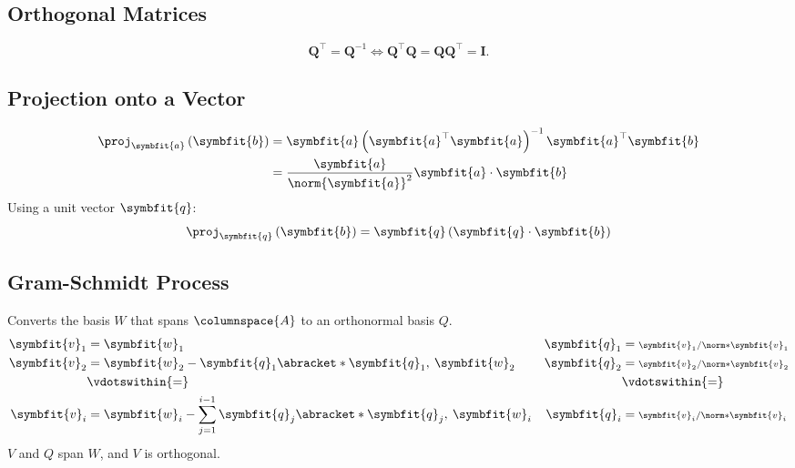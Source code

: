 \documentclass{article}
\begin{document}
\begin{multicols*}{3}
    \subsection{Orthogonal Matrices}
    \begin{equation*}
        \symbf{Q}^\top = \symbf{Q}^{-1}
        \iff
        \symbf{Q}^\top \symbf{Q} = \symbf{Q}\symbf{Q}^\top = \symbf{I}.
    \end{equation*}
    \subsection{Projection onto a Vector}
    \begin{align*}
        \proj_{\symbfit{a}} \left( \symbfit{b} \right) & = \symbfit{a} \left( \symbfit{a}^\top \symbfit{a} \right)^{-1} \symbfit{a}^\top \symbfit{b} \\
                                                       & = \frac{\symbfit{a}}{\norm{\symbfit{a}}^2} \symbfit{a} \cdot \symbfit{b}
    \end{align*}
    Using a unit vector \(\symbfit{q}\):
    \begin{equation*}
        \proj_{\symbfit{q}} \left( \symbfit{b} \right) = \symbfit{q} \left( \symbfit{q} \cdot \symbfit{b} \right)
    \end{equation*}
    \subsection{Gram-Schmidt Process}
    Converts the basis \(W\) that spans \(\columnspace{A}\) to an orthonormal basis \(Q\).
    \begin{align*}
        \symbfit{v}_1 & = \symbfit{w}_1                                                                                 & \symbfit{q}_1 & = {\scriptstyle \symbfit{v}_1 / \norm*{\symbfit{v}_1}} \\
        \symbfit{v}_2 & = \symbfit{w}_2 - \symbfit{q}_1 \abracket*{\symbfit{q}_1,\: \symbfit{w}_2}                      & \symbfit{q}_2 & = {\scriptstyle \symbfit{v}_2 / \norm*{\symbfit{v}_2}} \\
                      & \vdotswithin{=}                                                                                 &               & \vdotswithin{=}                                        \\
        \symbfit{v}_i & = \symbfit{w}_i - \sum_{j = 1}^{i - 1} \symbfit{q}_j \abracket*{\symbfit{q}_j,\: \symbfit{w}_i} & \symbfit{q}_i & = {\scriptstyle \symbfit{v}_i / \norm*{\symbfit{v}_i}}
    \end{align*}
    \(V\) and \(Q\) span \(W\), and \(V\) is orthogonal.

\end{multicols*}
\end{document}
